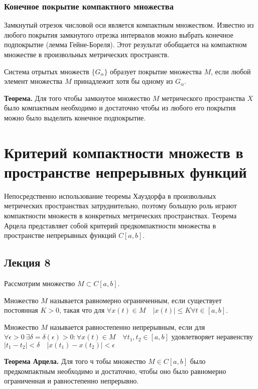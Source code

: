 \documentclass[12pt]{report}
\renewcommand{\[}{$\\\displaystyle}
\renewcommand{\]}{\\$}
\renewcommand{\[}{$\\\displaystyle}
\newcommand{\tth}[1][]{\textbf{Теорема#1.}}
\begin{document}
\subsubsection{Конечное покрытие компактного множества}

Замкнутый отрезок числовой оси является компактным множеством. Известно из любого покрытия замкнутого отрезка интервалов можно выбрать конечное подпокрытие (лемма Гейне-Бореля). Этот результат обобщается на компактном множестве в произвольных метрических пространств.

Система отрытых множеств $\{G_\alpha\}$ образует покрытие множества $M$, если любой элемент множества $M$ принадлежит хотя бы одному из $G_\alpha$.

\tth[] Для того чтобы замкнутое множество $M$ метрического пространства $X$ было компактным необходимо и достаточно чтобы из любого его покрытия можно было выделить конечное подпокрытие.

\section{Критерий компактности множеств в пространстве непрерывных функций}

Непосредственно использование теоремы Хауздорфа в произвольных метрических пространствах затруднительно, поэтому большую роль играют компактности множеств в конкретных метрических пространствах. Теорема Арцела представляет собой критерий предкомпактности множества в пространстве непрерывных функций $C[a,b]$.

\subsection{Лекция 8}

Рассмотрим множество $M\subset C[a,b]$.

Множество $M$ называется равномерно ограниченным, если существует постоянная $K>0$, такая что для $\forall x(t)\in M \quad |x(t)|\leq K \forall t \in [a,b]$.

Множество $M$ называется равностепенно непрерывным, если для $\forall \epsilon > 0 \ \exists \delta = \delta(\epsilon)>0:\forall x(t)\in M\quad \forall t_1,t_2\in [a,b]$ удовлетворяет неравенству $|t_1-t_2|<\delta \quad |x(t_1)-x(t_2)|<\epsilon$

\tth[ Арцела] Для того ч тобы множество $M\in C[a,b]$ было предкомпактным необходимо и достаточно, чтобы оно было равномерно ограниченная и равностепенно непрерывно.
\end{document}
